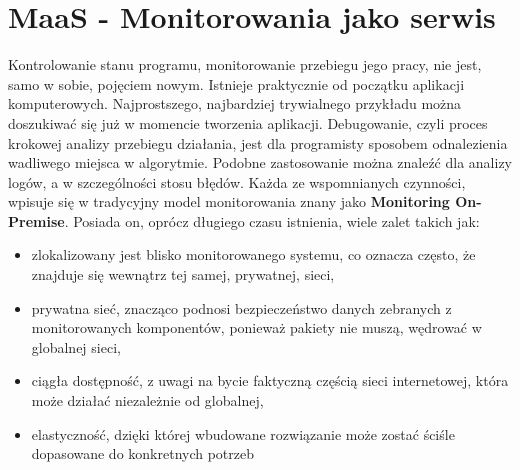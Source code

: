 \section{\textbf{MaaS} - Monitorowania jako serwis}
\label{chapter:monitoring_architecture:maas}

Kontrolowanie stanu programu, monitorowanie przebiegu jego pracy, nie jest, samo w sobie, pojęciem nowym. Istnieje praktycznie od początku 
aplikacji komputerowych. Najprostszego, najbardziej trywialnego przykładu można doszukiwać się już w momencie tworzenia aplikacji.
Debugowanie, czyli proces krokowej analizy przebiegu działania, jest dla programisty sposobem odnalezienia wadliwego miejsca w algorytmie.
Podobne zastosowanie można znaleźć dla analizy logów, a w szczególności stosu błędów. Każda ze wspomnianych czynności, wpisuje się w tradycyjny model
monitorowania znany jako \textbf{Monitoring On-Premise}. Posiada on, oprócz długiego czasu istnienia, wiele zalet takich jak:
\begin{itemize}
    \item zlokalizowany jest blisko monitorowanego systemu, co oznacza często, że znajduje się wewnątrz tej samej, prywatnej, sieci,
    \item prywatna sieć, znacząco podnosi bezpieczeństwo danych zebranych z monitorowanych komponentów, ponieważ pakiety nie muszą,
    wędrować w globalnej sieci,
    \item ciągła dostępność, z uwagi na bycie faktyczną częścią sieci internetowej, która może działać niezależnie od globalnej,
    \item elastyczność, dzięki której wbudowane rozwiązanie może zostać ściśle dopasowane do konkretnych potrzeb
\end{itemize}

